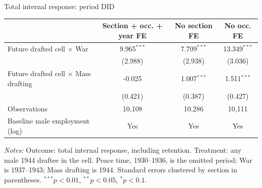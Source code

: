 \begin{frame}[t]{Total internal response: period DID}
    \scriptsize
    \centering
    \begin{threeparttable}
    \begin{tabular}{lccc}
        \toprule
        & Section + occ. + year FE & No section FE & No occ. FE \\
        \midrule
        Future drafted cell $\times$ War & 9.965$^{***}$ & 7.709$^{***}$ & 13.349$^{***}$ \\
        & (2.988) & (2.938) & (3.036) \\
        Future drafted cell $\times$ Mass drafting & -0.025 & 1.007$^{***}$ & 1.511$^{***}$ \\
        & (0.421) & (0.387) & (0.427) \\
        \midrule
        Observations & 10,108 & 10,286 & 10,111 \\
        Baseline male employment (log) & Yes & Yes & Yes \\
        \bottomrule
    \end{tabular}
    \begin{tablenotes}[flushleft]
        \tiny
        \item \textit{Notes:} Outcome: total internal response, including retention. Treatment: any male 1944 draftee in the cell. Peace time, 1930--1936, is the omitted period; War is 1937--1943; Mass drafting is 1944. Standard errors clustered by section in parentheses. $^{***}p<0.01$, $^{**}p<0.05$, $^{*}p<0.1$.
    \end{tablenotes}
    \end{threeparttable}
\end{frame}

